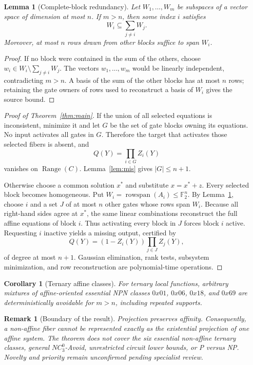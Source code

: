 \documentclass[11pt]{article}
\newtheorem{lemma}{Lemma}
\newtheorem{corollary}{Corollary}
\newtheorem{remark}{Remark}
\newcommand{\F}{\mathbb F_2}
\newcommand{\Range}{\operatorname{Range}}
\begin{document}
\begin{lemma}[Complete-block redundancy]\label{lem:block}
Let $W_1,\ldots,W_m$ be subspaces of a vector space of dimension at most $n$. If $m>n$, then some index $i$ satisfies
\[
W_i\subseteq\sum_{j\ne i}W_j.
\]
Moreover, at most $n$ rows drawn from other blocks suffice to span $W_i$.
\end{lemma}
\begin{proof}
If no block were contained in the sum of the others, choose $w_i\in W_i\setminus\sum_{j\ne i}W_j$. The vectors $w_1,\ldots,w_m$ would be linearly independent, contradicting $m>n$. A basis of the sum of the other blocks has at most $n$ rows; retaining the gate owners of rows used to reconstruct a basis of $W_i$ gives the source bound.
\end{proof}

\begin{proof}[Proof of Theorem~\ref{thm:main}]
If the union of all selected equations is inconsistent, minimize it and let $G$ be the set of gate blocks owning its equations. No input activates all gates in $G$. Therefore the target that activates those selected fibers is absent, and
\[
Q(Y)=\prod_{i\in G}Z_i(Y)
\]
vanishes on $\Range(C)$. Lemma~\ref{lem:mis} gives $|G|\le n+1$.

Otherwise choose a common solution $x^*$ and substitute $x=x^*+z$. Every selected block becomes homogeneous. Put $W_i=\operatorname{rowspan}(A_i)\le\F^n$. By Lemma~\ref{lem:block}, choose $i$ and a set $J$ of at most $n$ other gates whose rows span $W_i$. Because all right-hand sides agree at $x^*$, the same linear combinations reconstruct the full affine equations of block $i$. Thus activating every block in $J$ forces block $i$ active. Requesting $i$ inactive yields a missing output, certified by
\[
Q(Y)=(1-Z_i(Y))\prod_{j\in J}Z_j(Y),
\]
of degree at most $n+1$. Gaussian elimination, rank tests, subsystem minimization, and row reconstruction are polynomial-time operations.
\end{proof}

\begin{corollary}[Ternary affine classes]
For ternary local functions, arbitrary mixtures of affine-oriented essential NPN classes $0x01$, $0x06$, $0x18$, and $0x69$ are deterministically avoidable for $m>n$, including repeated supports.
\end{corollary}

\begin{remark}[Boundary of the result]
Projection preserves affinity. Consequently, a non-affine fiber cannot be represented exactly as the existential projection of one affine system. The theorem does not cover the six essential non-affine ternary classes, general $NC^0_3$-Avoid, unrestricted circuit lower bounds, or P versus NP. Novelty and priority remain unconfirmed pending specialist review.
\end{remark}
\end{document}
